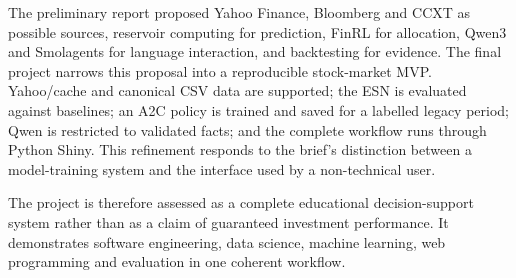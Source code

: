 The preliminary report proposed Yahoo Finance, Bloomberg and CCXT as possible sources, reservoir computing for prediction, FinRL for allocation, Qwen3 and Smolagents for language interaction, and backtesting for evidence. The final project narrows this proposal into a reproducible stock-market MVP. Yahoo/cache and canonical CSV data are supported; the ESN is evaluated against baselines; an A2C policy is trained and saved for a labelled legacy period; Qwen is restricted to validated facts; and the complete workflow runs through Python Shiny. This refinement responds to the brief's distinction between a model-training system and the interface used by a non-technical user.

The project is therefore assessed as a complete educational decision-support system rather than as a claim of guaranteed investment performance. It demonstrates software engineering, data science, machine learning, web programming and evaluation in one coherent workflow.

